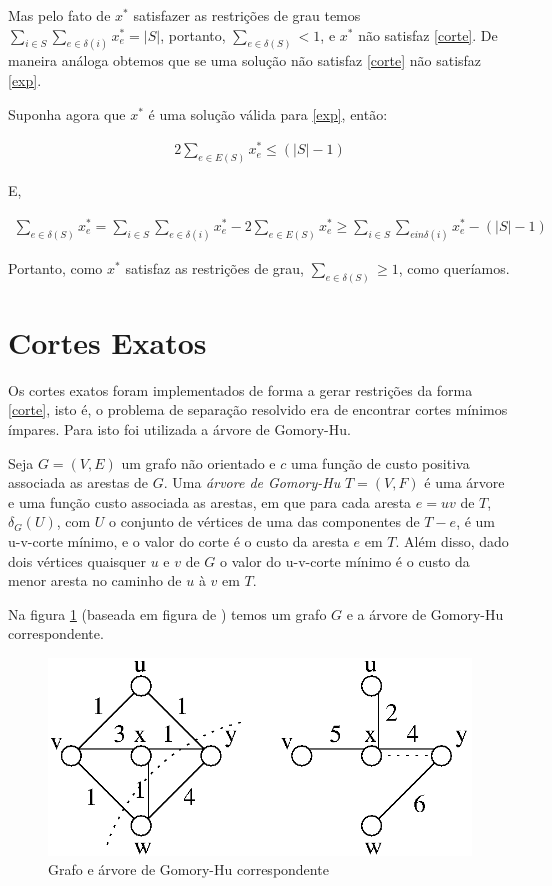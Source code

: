 \documentclass[11pt]{article}
\begin{document}
Mas pelo fato de $x^*$ satisfazer as restrições de grau temos $\sum_{i
  \in S}\sum_{e \in \delta (i)}x_e^* = |S|$, portanto, $\sum_{e \in
  \delta (S)} < 1$, e $x^*$ não satisfaz \eqref{corte}. De maneira
análoga obtemos que se uma solução não satisfaz \eqref{corte} não
satisfaz \eqref{exp}.

Suponha agora que $x^*$ é uma solução válida para \eqref{exp}, então:

\begin{align}
  2\sum_{e \in E(S)}x_e^* \le (|S| - 1)
\end{align}

E,

\begin{align}
  \sum_{e \in \delta (S)}x_e^* = \sum_{i \in S}\sum_{e \in \delta
    (i)}x_e^* - 2\sum_{e \in E(S)}x_e^* \ge \sum_{i \in S}\sum_{e in
    \delta (i)}x_e^* - (|S| - 1)
\end{align}

Portanto, como $x^*$ satisfaz as restrições de grau, $\sum_{e \in
  \delta (S)} \ge 1$, como queríamos.

\section{Cortes Exatos}
Os cortes exatos foram implementados de forma a gerar restrições da
forma \eqref{corte}, isto é, o problema de separação resolvido era de
encontrar cortes mínimos ímpares. Para isto foi utilizada a árvore de
Gomory-Hu.

Seja $G=(V,E)$ um grafo não orientado e $c$ uma função de custo
positiva associada as arestas de $G$. Uma \emph{árvore de Gomory-Hu}
$T=(V,F)$ é uma árvore e uma função custo associada as arestas, em que
para cada aresta $e = uv$ de $T$, $\delta_G(U)$, com $U$ o conjunto de
vértices de uma das componentes de $T-e$, é um u-v-corte mínimo, e o
valor do corte é o custo da aresta $e$ em $T$. Além disso, dado dois
vértices quaisquer $u$ e $v$ de $G$ o valor do u-v-corte mínimo é o
custo da menor aresta no caminho de $u$ à $v$ em $T$.

Na figura \ref{fig:gomoryhu} (baseada em figura de \cite{bondymurty})
temos um grafo $G$ e a árvore de Gomory-Hu correspondente.

\begin{figure}[H]
\centering
\includegraphics[scale=0.40]{gomoryhu}
\caption{Grafo e árvore de Gomory-Hu correspondente}
\label{fig:gomoryhu}
\end{figure}
\end{document}

